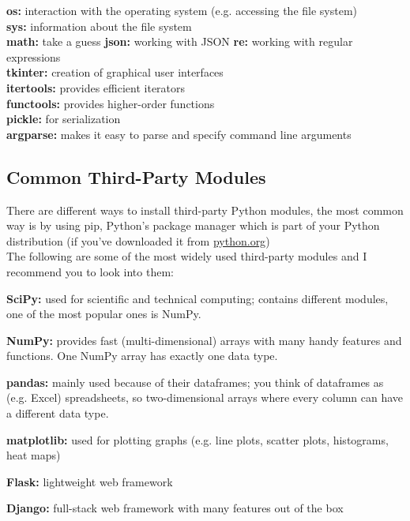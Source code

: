         \begin{indentblock}

            \textbf{os:} interaction with the operating system (e.g. accessing the file system) \\
            \textbf{sys:} information about the file system \\
            \textbf{math:} take a guess
            \textbf{json:} working with JSON
            \textbf{re:} working with regular expressions \\
            \textbf{tkinter:} creation of graphical user interfaces \\
            \textbf{itertools:} provides efficient iterators \\
            \textbf{functools:} provides higher-order functions \\
            \textbf{pickle:} for serialization \\
            \textbf{argparse:} makes it easy to parse and specify command line arguments

        \end{indentblock}

    \subsection{Common Third-Party Modules}
        There are different ways to install third-party Python modules, the most common way is by
        using pip, Python's package manager which is part of your Python distribution
        (if you've downloaded it from \href{https://python.org}{python.org})\\
        The following are some of the most widely used third-party modules and I recommend you to
        look into them:

        \begin{indentblock}

            \textbf{SciPy:} used for scientific and technical computing; contains different modules,
            one of the most popular ones is NumPy.

            \textbf{NumPy:} provides fast (multi-dimensional) arrays with many handy
            features and functions. One NumPy array has exactly one data type.

            \textbf{pandas:} mainly used because of their dataframes; you think of dataframes
            as (e.g. Excel) spreadsheets, so two-dimensional arrays where every column can have a
            different data type.

            \textbf{matplotlib:} used for plotting graphs (e.g. line plots, scatter plots, histograms,
            heat maps)

            \textbf{Flask:} lightweight web framework

            \textbf{Django:} full-stack web framework with many features out of the box

        \end{indentblock}
